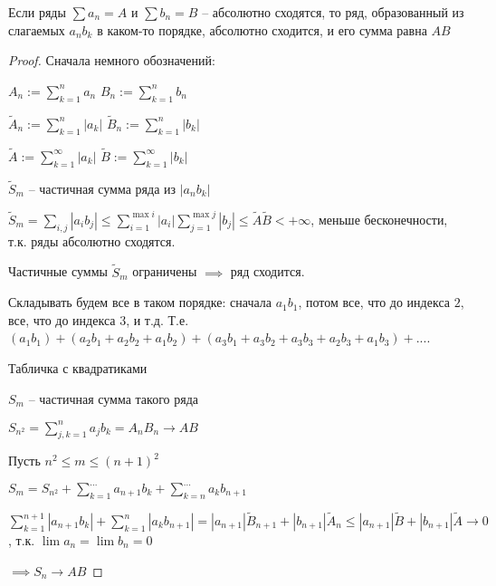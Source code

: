 \begin{theorem}[Коши] \thmslashn
	
	Если ряды $\sum a_n = A$ и $\sum b_n = B$ -- абсолютно сходятся, то ряд, образованный из слагаемых $a_nb_k$ в каком-то порядке, абсолютно сходится, и его сумма равна $AB$
\end{theorem}

\begin{proof} \thmslashn
	
	Сначала немного обозначений:

	$A_n := \sum\limits_{k = 1}^{n} a_n$ $B_n:= \sum\limits_{k=1}^{n}b_n$
	
	$\tilde{A}_n := \sum\limits_{k = 1}^{n}\left|a_k\right|$ $\tilde{B}_n := \sum\limits_{k=1}^{n}\left|b_k\right|$
	
	$\tilde{A} := \sum\limits_{k = 1}^{\infty}\left|a_k\right|$ $\tilde{B} := \sum\limits_{k=1}^{\infty}\left|b_k\right|$
	
	
	$\tilde{S}_m$ -- частичная сумма ряда из $\left|a_nb_k\right|$
	
	$\tilde{S}_m = \sum\limits_{i, j} \left|a_ib_j\right| \le \sum\limits_{i = 1}^{\max{i}}\left|a_i\right|\sum\limits_{j = 1}^{\max{j}}\left|b_j\right| \le \tilde{A}\tilde{B} < +\infty$, меньше бесконечности, т.к. ряды абсолютно сходятся.
	
	Частичные суммы $\tilde{S}_m$ ограничены $\implies $ ряд сходится.
	
	Складывать будем все в таком порядке: сначала $a_1b_1$, потом все, что до индекса $2$, все, что до индекса $3$, и т.д. Т.е. $(a_1b_1) + (a_2b_1 + a_2b_2 + a_1b_2) + (a_3b_1 + a_3b_2 + a_3b_3 + a_2b_3 + a_1b_3) + ...$.
	
	\TODO Табличка с квадратиками 
	
	$S_m$ -- частичная сумма такого ряда
	
	$S_{n^2} = \sum\limits_{j,k=1}^{n} a_j b_k = A_n B_n \to AB$
	
	Пусть $n^2 \le m \le (n+1)^2$
	
	$S_m = S_{n^2} + \sum\limits_{k=1}^{...}a_{n+1}b_k + \sum\limits_{k = n}^{...}a_kb_{n+1}$
	
	$\sum\limits_{k=1}^{n+1}\left|a_{n+1}b_k\right| + \sum\limits_{k=1}^{n}\left|a_kb_{n+1}\right| = \left|a_{n+1}\right|\tilde{B}_{n+1} + \left|b_{n+1}\right|\tilde{A}_{n} \le \left|a_{n+1}\right|\tilde{B} + \left|b_{n+1}\right|\tilde{A} \to 0$, т.к. $\lim a_n = \lim b_n = 0$
	
	$\implies S_n \to AB$
\end{proof}

